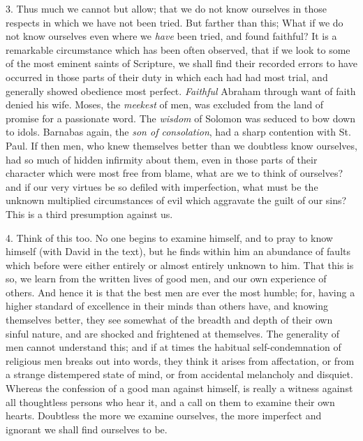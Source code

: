 3. Thus much we cannot but allow; that we do not know
ourselves in those respects in which we have not been
tried. But farther than this; What if we do not know
ourselves even where we \emph{have} been tried, and
found faithful? It is a remarkable circumstance which has
been often observed, that if we look to some of the most
eminent saints of Scripture, we shall find their recorded
errors to have occurred in those parts of their duty in
which each had had most trial, and generally showed
obedience most perfect. \emph{Faithful} Abraham through
want of faith denied his wife. Moses, the \emph{meekest}
of men, was excluded from the land of promise for a
passionate word. The \emph{wisdom} of Solomon was
seduced to bow down to idols. Barnabas again, the \emph{son
of consolation}, had a sharp contention with St. Paul.
If then men, who knew themselves better than we doubtless
know ourselves, had so much of hidden infirmity about
them, even in those parts of their character which were
most free from blame, what are we to think of ourselves?
and if our very virtues be so defiled with imperfection,
what must be the unknown multiplied circumstances of evil
which aggravate the guilt of our sins? This is a third
presumption against us.

4. Think of this too. No one begins to examine
himself, and to pray to know himself (with David in the
text), but he finds within him an abundance of faults
which before were either entirely or almost entirely
unknown to him. That this is so, we learn from the
written lives of good men, and our own experience of
others. And hence it is that the best men are ever the
most humble; for, having a higher standard of excellence
in their minds than others have, and knowing themselves
better, they see somewhat of the breadth and depth of
their own sinful nature, and are shocked and frightened
at themselves. The generality of men cannot understand
this; and if at times the habitual self-condemnation of
religious men breaks out into words, they think it arises
from affectation, or from a strange distempered state of
mind, or from accidental melancholy and disquiet. Whereas
the confession of a good man against himself, is really a
witness against all thoughtless persons who hear it, and
a call on them to examine their own hearts. Doubtless the
more we examine ourselves, the more imperfect and
ignorant we shall find ourselves to be.

